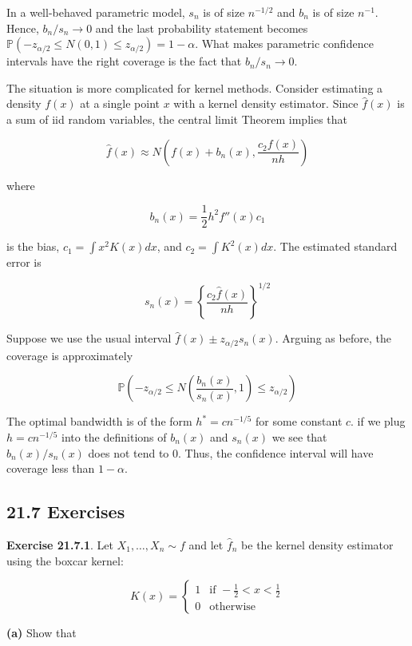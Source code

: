 In a well-behaved parametric model, \(s_{n}\) is of size \(n^{-1/2}\) and
\(b_{n}\) is of size \(n^{-1}\). Hence, \(b_{n} / s_{n} \rightarrow 0\) and
the last probability statement becomes
\(\mathbb{P}\left(- z_{\alpha / 2} \leq N\left(0, 1\right) \leq z_{\alpha / 2}\right) = 1 - \alpha\).
What makes parametric confidence intervals have the right coverage is
the fact that \(b_{n} / s_{n} \rightarrow 0\).

The situation is more complicated for kernel methods. Consider
estimating a density \(f(x)\) at a single point \(x\) with a kernel
density estimator. Since \(\hat{f}(x)\) is a sum of iid random
variables, the central limit Theorem implies that

\[ \hat{f}(x) \approx N \left( f(x) + b_{n}(x), \frac{c_{2} f(x)}{nh} \right) \]

where

\[ b_{n}(x) = \frac{1}{2} h^{2} f''(x) c_{1} \]

is the bias, \(c_{1} = \int x^{2} K(x) dx\), and \(c_{2} = \int K^{2}(x) dx\).
The estimated standard error is

\[ s_{n}(x) = \left\{ \frac{c_{2} \hat{f}(x)}{nh} \right\}^{1/2} \]

Suppose we use the usual interval
\(\hat{f}(x) \pm z_{\alpha/2} s_{n}(x)\). Arguing as before, the coverage
is approximately

\[ \mathbb{P}\left(-z_{\alpha/2} \leq N\left(\frac{b_{n}(x)}{s_{n}(x)}, 1\right) \leq z_{\alpha/2} \right) \]

The optimal bandwidth is of the form \(h^* = cn^{-1/5}\) for some
constant \(c\). if we plug \(h = cn^{-1/5}\) into the definitions of
\(b_{n}(x)\) and \(s_{n}(x)\) we see that \(b_{n}(x) / s_{n}(x)\) does not tend
to 0. Thus, the confidence interval will have coverage less than
\(1 - \alpha\).

\subsection*{21.7 Exercises}

\textbf{Exercise 21.7.1}. Let \(X_{1}, \dots, X_{n} \sim f\) and let
\(\hat{f}_{n}\) be the kernel density estimator using the boxcar kernel:

\[ K(x) = \begin{cases}
1 & \text{if } -\frac{1}{2} < x < \frac{1}{2} \\
0 & \text{otherwise}
\end{cases}\]

\textbf{(a)} Show that

